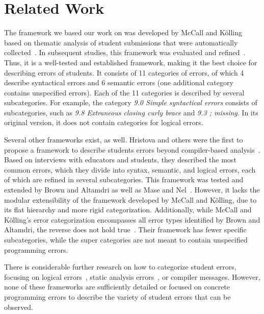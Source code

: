 \section{Related Work}
The framework we based our work on was developed by McCall and Kölling based on thematic analysis of student submissions that were automatically collected~\cite{Kölling2014}. In subsequent studies, this framework was evaluated and refined~\cite{Kölling2019}. Thus, it is a well-tested and established framework, making it the best choice for describing errors of students. It consists of 11 categories of errors, of which 4 describe syntactical errors and 6 semantic errors (one additional category contains unspecified errors). Each of the 11 categories is described by several subcategories. For example, the category \emph{9.0 Simple syntactical errors} consists of subcategories, such as \emph{9.8 Extraneous closing curly brace} and \emph{9.3 ; missing}. In its original version, it does not contain categories for logical errors.

Several other frameworks exist, as well. Hristova and others were the first to propose a framework to describe students errors beyond compiler-based analysis~\cite{Hristova2003}. Based on interviews with educators and students, they described the most common errors, which they divide into syntax, semantic, and logical errors, each of which are refined in several subcategories. This framework was tested and extended by Brown and Altamdri as well as Mase and Nel~\cite{Brown2014, Mase2022}. However, it lacks the modular extensibility of the framework developed by McCall and Kölling, due to its flat hierarchy and more rigid categorization. Additionally, while McCall and Kölling's error categorization encompasses all error types identified by Brown and Altamdri, the reverse does not hold true~\cite{Kölling2019, Brown2017}. Their framework has fewer specific subcategories, while the super categories are not meant to contain unspecified programming errors.

There is considerable further research on how to categorize student errors, focusing on logical errors~\cite{Ettles2018}, static analysis errors~\cite{Edwards2017}, or compiler messages\cite{DennyCompiler, Tabano2011Compiler}. However, none of these frameworks are sufficiently detailed or focused on concrete programming errors to describe the variety of student errors that can be observed.

